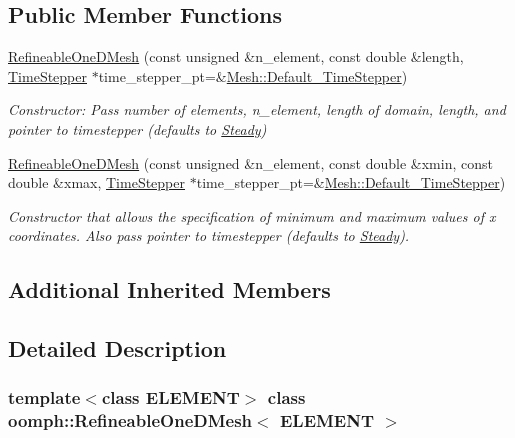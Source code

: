 \subsection*{Public Member Functions}
\begin{DoxyCompactItemize}
\item 
\hyperlink{classoomph_1_1RefineableOneDMesh_afd56915c8d1092fe6063184431c2d322}{Refineable\+One\+D\+Mesh} (const unsigned \&n\+\_\+element, const double \&length, \hyperlink{classoomph_1_1TimeStepper}{Time\+Stepper} $\ast$time\+\_\+stepper\+\_\+pt=\&\hyperlink{classoomph_1_1Mesh_a12243d0fee2b1fcee729ee5a4777ea10}{Mesh\+::\+Default\+\_\+\+Time\+Stepper})
\begin{DoxyCompactList}\small\item\em Constructor\+: Pass number of elements, n\+\_\+element, length of domain, length, and pointer to timestepper (defaults to \hyperlink{classoomph_1_1Steady}{Steady}) \end{DoxyCompactList}\item 
\hyperlink{classoomph_1_1RefineableOneDMesh_a6745ddd579ead642b9eac1b1520d4b5c}{Refineable\+One\+D\+Mesh} (const unsigned \&n\+\_\+element, const double \&xmin, const double \&xmax, \hyperlink{classoomph_1_1TimeStepper}{Time\+Stepper} $\ast$time\+\_\+stepper\+\_\+pt=\&\hyperlink{classoomph_1_1Mesh_a12243d0fee2b1fcee729ee5a4777ea10}{Mesh\+::\+Default\+\_\+\+Time\+Stepper})
\begin{DoxyCompactList}\small\item\em Constructor that allows the specification of minimum and maximum values of x coordinates. Also pass pointer to timestepper (defaults to \hyperlink{classoomph_1_1Steady}{Steady}). \end{DoxyCompactList}\end{DoxyCompactItemize}
\subsection*{Additional Inherited Members}


\subsection{Detailed Description}
\subsubsection*{template$<$class E\+L\+E\+M\+E\+NT$>$\newline
class oomph\+::\+Refineable\+One\+D\+Mesh$<$ E\+L\+E\+M\+E\+N\+T $>$}

